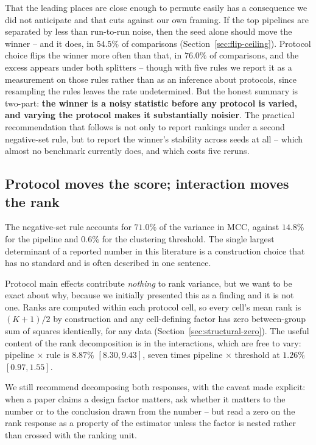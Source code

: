 \documentclass[11pt,a4paper]{article}
\begin{document}
That the leading places are close enough to permute easily has a consequence we did not
anticipate and that cuts against our own framing. If the top pipelines are separated by
less than run-to-run noise, then the seed alone should move the winner -- and it does, in
$54.5\%$ of comparisons (Section~\ref{sec:flip-ceiling}). Protocol choice flips the winner
more often than that, in $76.0\%$ of comparisons, and the excess appears under both
splitters -- though with five rules we report it as a measurement on those rules rather
than as an inference about protocols, since resampling the rules leaves the rate
undetermined. But the honest summary is two-part: \textbf{the winner is
a noisy statistic before any protocol is varied, and varying the protocol makes it
substantially noisier}. The practical recommendation that follows is not only to report
rankings under a second negative-set rule, but to report the winner's stability across
seeds at all -- which almost no benchmark currently does, and which costs five reruns.

\subsection{Protocol moves the score; interaction moves the rank}

The negative-set rule accounts for $71.0\%$ of the variance in MCC, against $14.8\%$ for
the pipeline and $0.6\%$ for the clustering threshold. The single largest determinant of a
reported number in this literature is a construction choice that has no standard and is
often described in one sentence.

Protocol main effects contribute \emph{nothing} to rank variance, but we want to be exact
about why, because we initially presented this as a finding and it is not one. Ranks are
computed within each protocol cell, so every cell's mean rank is $(K+1)/2$ by construction
and any cell-defining factor has zero between-group sum of squares identically, for any
data (Section~\ref{sec:structural-zero}). The useful content of the rank decomposition is
in the interactions, which are free to vary: pipeline $\times$ rule is $8.87\%$
$[8.30, 9.43]$, seven times pipeline $\times$ threshold at $1.26\%$ $[0.97, 1.55]$.

We still recommend decomposing both responses, with the caveat made explicit: when a paper
claims a design factor matters, ask whether it matters to the number or to the conclusion
drawn from the number -- but read a zero on the rank response as a property of the
estimator unless the factor is nested rather than crossed with the ranking unit.
\end{document}
